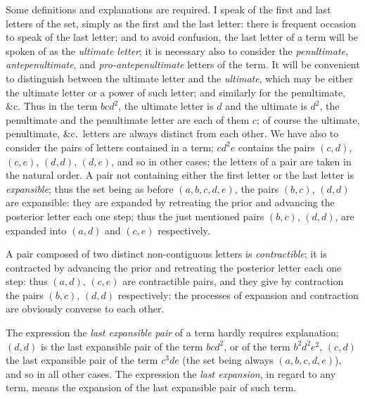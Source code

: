 \documentclass[11pt,a4paper]{article}
\theoremstyle{definition}
\begin{document}
Some definitions and explanations are required. I speak of the first and last letters of the set, simply as the first and the last letter: there is frequent occasion to speak of the last letter; and to avoid confusion, the last letter of a term will be spoken of as the \textit{ultimate letter}; it is necessary also to consider the \textit{penultimate}, \textit{antepenultimate}, and \textit{pro-antepenultimate} letters of the term. It will be convenient to distinguish between the ultimate letter and the \textit{ultimate}, which may be either the ultimate letter or a power of such letter; and similarly for the penultimate, \&c. Thus in the term $bcd^2$, the ultimate letter is $d$ and the ultimate is $d^2$, the penultimate and the penultimate letter are each of them $c$; of course the ultimate, penultimate, \&c.\ letters are always distinct from each other. We have also to consider the pairs of letters contained in a term; $cd^2e$ contains the pairs $(c,d)$, $(c,e)$, $(d,d)$, $(d,e)$, and so in other cases; the letters of a pair are taken in the natural order. A pair not containing either the first letter or the last letter is \textit{expansible}; thus the set being as before $(a,b,c,d,e)$, the pairs $(b,c)$, $(d,d)$ are expansible: they are expanded by retreating the prior and advancing the posterior letter each one step; thus the just mentioned pairs $(b,c)$, $(d,d)$, are expanded into $(a,d)$ and $(c,e)$ respectively.

A pair composed of two distinct non-contiguous letters is \textit{contractible}; it is contracted by advancing the prior and retreating the posterior letter each one step: thus $(a,d)$, $(c,e)$ are contractible pairs, and they give by contraction the pairs $(b,c)$, $(d,d)$ respectively: the processes of expansion and contraction are obviously converse to each other.

The expression the \textit{last expansible pair} of a term hardly requires explanation; $(d,d)$ is the last expansible pair of the term $bcd^2$, or of the term $b^2d^2e^2$, $(c,d)$ the last expansible pair of the term $c^3de$ (the set being always $(a,b,c,d,e)$), and so in all other cases. The expression the \textit{last expansion}, in regard to any term, means the expansion of the last expansible pair of such term.
\end{document}
